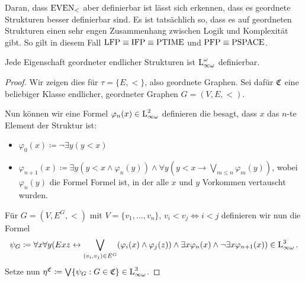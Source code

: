 Daran, dass $\operatorname{EVEN}_<$ aber definierbar ist lässt sich erkennen, dass es geordnete Strukturen besser definierbar sind. Es ist tatsächlich so, dass es auf geordneten Strukturen einen sehr engen Zusammenhang zwischen Logik und Komplexität gibt. So gilt in diesem Fall $\operatorname{LFP}\equiv\operatorname{IFP}\equiv\operatorname{PTIME}$ und $\operatorname{PFP}\equiv\operatorname{PSPACE}$.

\begin{satz}
	Jede Eigenschaft geordneter endlicher Strukturen ist $\operatorname{L}_{\infty\omega}^\omega$ definierbar.
\end{satz}
\begin{proof}
	Wir zeigen dies für $\tau=\{E,<\}$, also geordnete Graphen. Sei dafür $\mathfrak{C}$ eine beliebiger Klasse endlicher, geordneter Graphen $G=(V,E,<)$.
	
	Nun können wir eine Formel $\varphi_n(x)\in \operatorname{L}_{\infty\omega}^2$ definieren die besagt, dass $x$ das $n$-te Element der Struktur ist:
	\begin{itemize}
		\item $\varphi_0(x) \coloneqq \neg\exists y (y<x)$
		\item $\varphi_{n+1}(x)\coloneqq \exists y (y<x \land \varphi_n(y)) \land \forall y(y<x \rightarrow \bigvee_{m\leq n}\varphi_m(y))$, wobei $\varphi_n(y)$ die Formel Formel ist, in der alle $x$ und $y$ Vorkommen vertauscht wurden.
	\end{itemize}
	
	Für $G=(V,E^G,<)$ mit $V=\{v_1,\dots,v_n\}$, $v_i<v_j\Leftrightarrow i<j$ definieren wir nun die Formel
	\[\psi_G\coloneqq \forall x \forall y(Exz \leftrightarrow \bigvee_{(v_i,v_j)\in E^G}(\varphi_i(x) \land \varphi_j(z)) \land \exists x \varphi_n(x) \land \neg\exists x \varphi_{n+1}(x))\in \operatorname{L}_{\infty\omega}^3.\]
	Setze nun $\eta^{\mathfrak{C}} \coloneqq \bigvee\{\psi_G : G\in \mathfrak{C}\}\in \operatorname{L}_{\infty\omega}^3$.
\end{proof}









